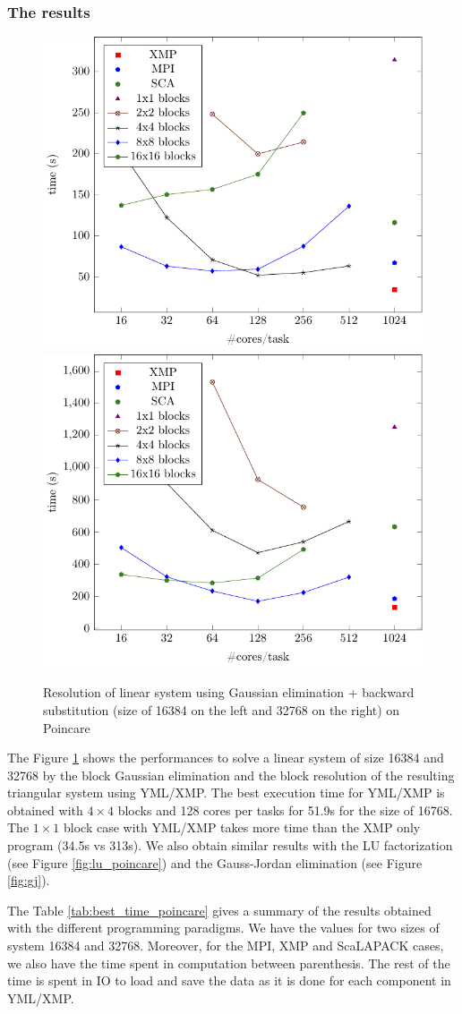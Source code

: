 \subsubsection{The results}

\begin{figure}[h]
	\caption{Resolution of linear system using Gaussian elimination + backward substitution (size of 16384 on the left and 32768 on the right) on Poincare\label{fig:g1}}
	\centering
	\includegraphics[width=.49\textwidth]{fig-g-16k.pdf}
	\includegraphics[width=.49\textwidth]{fig-g-32k.pdf}
\end{figure}

The Figure \ref{fig:g1} shows the performances to solve a linear system of size 16384 and 32768 by the block Gaussian elimination and the block resolution of the resulting triangular system using YML/XMP.
The best execution time for YML/XMP is obtained with $4 \times 4$ blocks and 128 cores per tasks for 51.9s for the size of 16768.
The $1 \times 1$ block case with YML/XMP takes more time than the XMP only program (34.5s vs 313s).
We also obtain similar results with the LU factorization (see Figure \ref{fig:lu_poincare}) and the Gauss-Jordan elimination (see Figure \ref{fig:gj}).

The Table \ref{tab:best_time_poincare} gives a summary of the results obtained with the different programming paradigms.
We have the values for two sizes of system 16384 and 32768.
Moreover, for the MPI, XMP and ScaLAPACK cases, we also have the time spent in computation between parenthesis.
The rest of the time is spent in IO to load and save the data as it is done for each component in YML/XMP.

